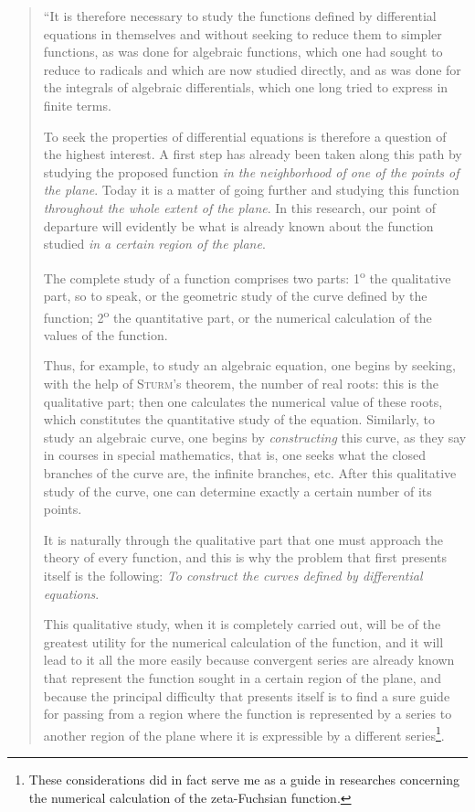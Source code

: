 \documentclass[11pt]{article}
\begin{document}
\begin{quote}
“It is therefore necessary to study the functions defined by differential equations in themselves and without seeking to reduce them to simpler functions, as was done for algebraic functions, which one had sought to reduce to radicals and which are now studied directly, and as was done for the integrals of algebraic differentials, which one long tried to express in finite terms.

To seek the properties of differential equations is therefore a question of the highest interest. A first step has already been taken along this path by studying the proposed function \emph{in the neighborhood of one of the points of the plane}. Today it is a matter of going further and studying this function \emph{throughout the whole extent of the plane}. In this research, our point of departure will evidently be what is already known about the function studied \emph{in a certain region of the plane}.

The complete study of a function comprises two parts: 1\textsuperscript{o} the qualitative part, so to speak, or the geometric study of the curve defined by the function; 2\textsuperscript{o} the quantitative part, or the numerical calculation of the values of the function.

Thus, for example, to study an algebraic equation, one begins by seeking, with the help of \textsc{Sturm}’s theorem, the number of real roots: this is the qualitative part; then one calculates the numerical value of these roots, which constitutes the quantitative study of the equation. Similarly, to study an algebraic curve, one begins by \emph{constructing} this curve, as they say in courses in special mathematics, that is, one seeks what the closed branches of the curve are, the infinite branches, etc. After this qualitative study of the curve, one can determine exactly a certain number of its points.

It is naturally through the qualitative part that one must approach the theory of every function, and this is why the problem that first presents itself is the following: \emph{To construct the curves defined by differential equations}.

This qualitative study, when it is completely carried out, will be of the greatest utility for the numerical calculation of the function, and it will lead to it all the more easily because convergent series are already known that represent the function sought in a certain region of the plane, and because the principal difficulty that presents itself is to find a sure guide for passing from a region where the function is represented by a series to another region of the plane where it is expressible by a different series\footnote[1]{These considerations did in fact serve me as a guide in researches concerning the numerical calculation of the zeta-Fuchsian function.}.


\end{quote}
\end{document}
